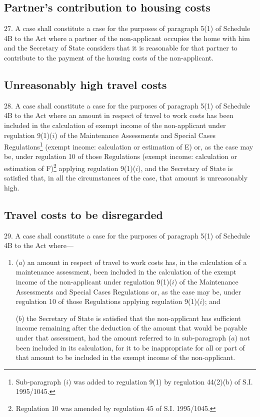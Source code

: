 \documentclass[a4paper]{article}
\begin{document}
\subsection[27. Partner’s contribution to housing costs]{Partner’s contribution to housing costs}

27. A case shall constitute a case for
the purposes of paragraph 5(1) of Schedule 4B to the Act where a partner of the
non-applicant occupies the home with him and the Secretary of State considers
that it is reasonable for that partner to contribute to the payment of the
housing costs of the non-applicant.

\subsection[28. Unreasonably high travel costs]{Unreasonably high travel costs}

28. A case shall constitute a case for the
purposes of paragraph 5(1) of Schedule 4B to the Act where an amount in respect
of travel to work costs has been included in the calculation of exempt income of
the non-applicant under regulation 9(1)($i$) of the Maintenance Assessments and
Special Cases Regulations\footnote{\frenchspacing Sub-paragraph ($i$) was added to regulation 9(1) by regulation 44(2)(b) of S.I. 1995/1045.} (exempt income: calculation or estimation of E)
or, as the case may be, under regulation 10 of those Regulations (exempt income:
calculation or estimation of F)\footnote{\frenchspacing Regulation 10 was amended by regulation 45 of S.I. 1995/1045.} applying regulation 9(1)($i$), and the
Secretary of State is satisfied that, in all the circumstances of the case, that
amount is unreasonably high.

\subsection[29. Travel costs to be disregarded]{Travel costs to be disregarded}

29. A case shall constitute a case for the
purposes of paragraph 5(1) of Schedule 4B to the Act where—
\begin{enumerate}\item[]
($a$) an amount in respect of travel to work costs has, in the calculation of a
maintenance assessment, been included in the calculation of the exempt income of
the non-applicant under regulation 9(1)($i$) of the Maintenance Assessments and
Special Cases Regulations or, as the case may be, under regulation 10 of those
Regulations applying regulation 9(1)($i$); and

($b$) the Secretary of State is satisfied that the non-applicant has sufficient
income remaining after the deduction of the amount that would be payable under
that assessment, had the amount referred to in sub-paragraph ($a$) not been
included in its calculation, for it to be inappropriate for all or part of that
amount to be included in the exempt income of the non-applicant.
\end{enumerate}
\end{document}
